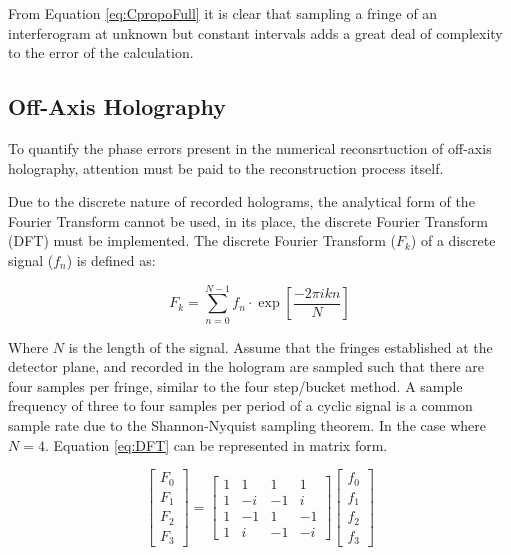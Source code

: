 \documentclass[10pt,letterpaper]{article}
\begin{document}
From Equation \ref{eq:CpropoFull} it is clear that sampling a fringe of an interferogram at unknown but constant intervals adds a great deal of complexity to the error of the calculation. 


\subsection{Off-Axis Holography}

To quantify the phase errors present in the numerical reconsrtuction of off-axis holography, attention must be paid to the reconstruction process itself. \par

Due to the discrete nature of recorded holograms, the analytical form of the Fourier Transform cannot be used, in its place, the discrete Fourier Transform (DFT) must be implemented. The discrete Fourier Transform ($F_k$) of a discrete signal ($f_n$) is defined as:

\begin{equation}
F_k=\sum_{n=0}^{N-1}f_n\cdot \exp\left[\frac{-2\pi ikn}{N}\right]
\label{eq:DFT}
\end{equation}

Where $N$ is the length of the signal. Assume that the fringes established at the detector plane, and recorded in the hologram are sampled such that there are four samples per fringe, similar to the four step/bucket method. A sample frequency of three to four samples per period of a cyclic signal is a common sample rate due to the Shannon-Nyquist sampling theorem. In the case where $N=4$. Equation \ref{eq:DFT} can be represented in matrix form.

\begin{equation}
\left[
\begin{matrix}
F_0\\
F_1\\
F_2\\
F_3
\end{matrix}
\right]
=
\left[
\begin{matrix}
1 & 1 & 1 & 1\\
1 & -i & -1 & i\\
1 & -1 & 1 & -1\\
1 & i & -1 & -i
\end{matrix}
\right]
\left[
\begin{matrix}
f_0\\
f_1\\
f_2\\
f_3
\end{matrix}
\right]
\end{equation}
\end{document}
